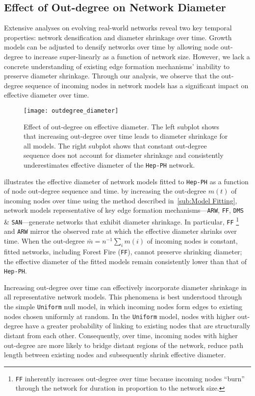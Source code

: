 \subsection{Effect of Out-degree on Network Diameter}
Extensive analyses \cite{hu2009evolution,mcglohon2011statistical,leskovec2005graphs} on evolving
real-world networks reveal two key temporal properties: network densification and diameter
shrinkage over time. Growth models can be adjusted to densify networks over time
by allowing node out-degree to increase super-linearly as a
function of network size. However, we lack a concrete understanding of existing
edge formation mechanisms' inability to preserve diameter shrinkage. Through our
analysis, we observe that the out-degree sequence of incoming nodes in
network models has a significant impact on effective diameter over time.
\begin{figure}
 \vspace{-10pt}
 \centering
 \texttt{[image: outdegree\_diameter]}
 \caption{
 Effect of out-degree on effective diameter.
 The left subplot shows that increasing out-degree over time leads to diameter
 shrinkage for all models. The right subplot shows that
 constant out-degree sequence does not account for diameter
 shrinkage and consistently underestimates effective diameter of the \texttt{Hep-PH}
 network.}
 \label{fig:diameter}
 \vspace{-10pt}
\end{figure}

 illustrates the effective diameter of network models fitted
to \texttt{Hep-PH} as a function of node out-degree sequence and time.
by increasing the
out-degree $m(t)$ of incoming nodes over time using the method described
in~\cref{sub:Model Fitting}, network models representative of key edge formation
mechanisms---\texttt{ARW}, \texttt{FF}, \texttt{DMS} \&
\texttt{SAN}---generate networks that exhibit diameter shrinkage. In particular,
\texttt{FF} \footnote{\texttt{FF} inherently increases out-degree over time
because incoming nodes ``burn'' through the network for duration in proportion
to the network size.} and \texttt{ARW} mirror the observed rate at which the
effective diameter shrinks over time.
When the out-degree $\bar{m}=n^{-1}\sum_i m(i)$ of incoming nodes is constant,
fitted networks, including Forest Fire (\texttt{FF}), cannot preserve
shrinking diameter; the effective diameter of the fitted models remain
consistently lower than that of \texttt{Hep-PH}.

Increasing out-degree over time can effectively incorporate diameter shrinkage
in all representative network models. This phenomena is best understood through
the simple \texttt{Uniform} null model, in which incoming nodes form edges to
existing nodes chosen uniformly at random. In the \texttt{Uniform} model, nodes with higher out-degree
have a greater probability of linking to existing
nodes that are structurally distant from each other. Consequently, over time,
incoming nodes with higher out-degree are more likely to bridge distant regions
of the network, reduce path length between existing nodes and subsequently
shrink effective diameter.

